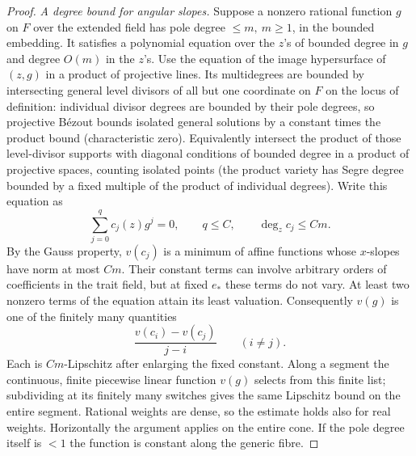 \begin{proof}
\emph{A degree bound for angular slopes.}
Suppose a nonzero rational function \(g\) on \(F\) over the extended field has pole degree \(\le m,\ m\ge1\), in the bounded embedding.
It satisfies a polynomial equation over the \(z\)'s of bounded degree in \(g\) and degree \(O(m)\) in the \(z\)'s.
Use the equation of the image hypersurface of \((z,g)\) in a product of projective lines.
Its multidegrees are bounded by intersecting general level divisors of all but one coordinate on \(F\) on the locus of definition: individual divisor degrees are bounded by their pole degrees, so projective B\'ezout bounds isolated general solutions by a constant times the product bound (characteristic zero).
Equivalently intersect the product of those level-divisor supports with diagonal conditions of bounded degree in a product of projective spaces, counting isolated points (the product variety has Segre degree bounded by a fixed multiple of the product of individual degrees).
Write this equation as
\[
 \sum_{j=0}^q c_j(z)g^j=0,
 \qquad q\le C,\qquad \deg_z c_j\le Cm .
\]
By the Gauss property, \(v(c_j)\) is a minimum of affine functions whose
\(x\)-slopes have norm at most \(Cm\).  Their constant terms can involve
arbitrary orders of coefficients in the trait field, but at fixed
\(e_*\) these terms do not vary.
At least two nonzero terms of the equation attain its least valuation.
Consequently \(v(g)\) is one of the finitely many quantities
\[
 \frac{v(c_i)-v(c_j)}{j-i}\qquad(i\ne j).
\]
Each is \(Cm\)-Lipschitz after enlarging the fixed constant.
Along a segment the continuous, finite piecewise linear function
\(v(g)\) selects from this finite list; subdividing at its finitely many
switches gives the same Lipschitz bound on the entire segment.
Rational weights are dense, so the estimate holds also for real
weights.  Horizontally the argument applies on the entire cone.
If the pole degree itself is \(<1\) the function is constant along the generic fibre.

\end{proof}

